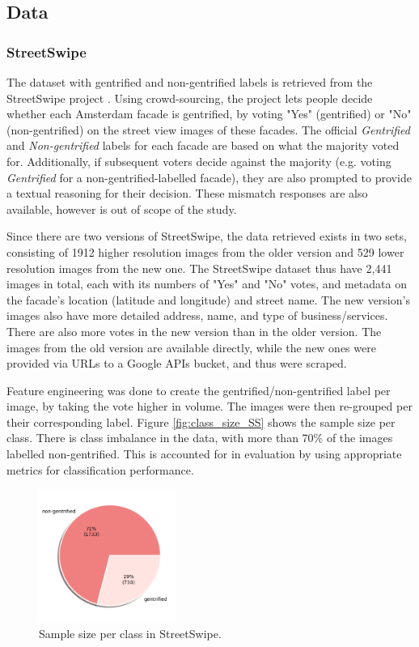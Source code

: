 \subsection{Data}
\subsubsection{StreetSwipe}
The dataset with gentrified and non-gentrified labels is retrieved from the StreetSwipe project \cite{streetswipe}. Using crowd-sourcing, the project lets people decide whether each Amsterdam facade is gentrified, by voting "Yes" (gentrified) or "No" (non-gentrified) on the street view images of these facades. The official \textit{Gentrified} and \textit{Non-gentrified} labels for each facade are based on what the majority voted for. Additionally, if subsequent voters decide against the majority (e.g. voting \textit{Gentrified} for a non-gentrified-labelled facade), they are also prompted to provide a textual reasoning for their decision. These mismatch responses are also available, however is out of scope of the study. 

Since there are two versions of StreetSwipe, the data retrieved exists in two sets, consisting of 1912 higher resolution images from the older version and 529 lower resolution images from the new one. The StreetSwipe dataset thus have 2,441 images in total, each with its numbers of "Yes" and "No" votes, and metadata on the facade's location (latitude and longitude) and street name. The new version's images also have more detailed address, name, and type of business/services. There are also more votes in the new version than in the older version. The images from the old version are available directly, while the new ones were provided via URLs to a Google APIs bucket, and thus were scraped.

Feature engineering was done to create the gentrified/non-gentrified label per image, by taking the vote higher in volume. The images were then re-grouped per their corresponding label. Figure \ref{fig:class_size_SS} shows the sample size per class. There is class imbalance in the data, with more than 70\% of the images labelled non-gentrified. This is accounted for in evaluation by using appropriate metrics for classification performance.

\begin{figure}[H]
    \centering
    \includegraphics[width=0.4\textwidth]{media/methodology/SS_class_size.png}
    \caption{Sample size per class in StreetSwipe.}
    \label{fig:SS_class_size}
\end{figure}


